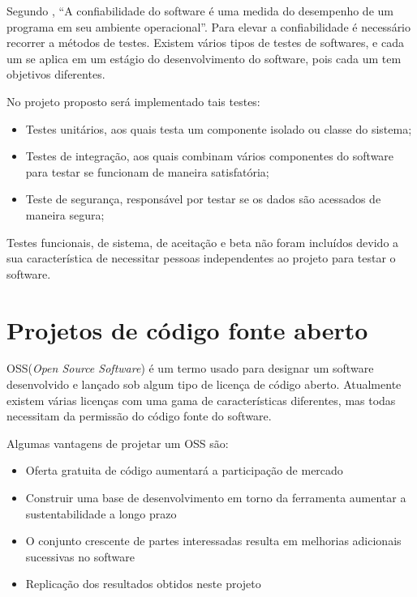 Segundo \cite{mathur1991performance}, “A confiabilidade do software é uma medida do desempenho de um programa em seu ambiente operacional”. Para elevar a confiabilidade é necessário recorrer a métodos de testes. Existem vários tipos de testes de softwares, e cada um se aplica em um estágio do desenvolvimento do software, pois cada um tem objetivos diferentes\cite{nidhra2012black}. \par
No projeto proposto será implementado tais testes: \par
\begin{itemize}  
\item Testes unitários, aos quais testa um componente isolado ou classe do sistema;
\item Testes de integração, aos quais combinam vários componentes do software para testar se funcionam de maneira satisfatória;
\item Teste de segurança, responsável por testar se os dados são acessados de maneira segura;
\end{itemize}
Testes funcionais, de sistema, de aceitação e beta não foram incluídos devido a sua característica de necessitar pessoas independentes ao projeto para testar o software.

\section{Projetos de código fonte aberto}
OSS(\textit{Open Source Software}) é um termo usado para designar um software desenvolvido e lançado sob algum tipo de licença de código aberto. Atualmente existem várias licenças com uma gama de características diferentes, mas todas necessitam da permissão do código fonte do software\cite{crowston2003defining}.

Algumas vantagens de projetar um OSS são:
\begin{itemize}  
\item Oferta gratuita de código aumentará a participação de mercado\cite{fitzgerald2006transformation}
\item Construir uma base de desenvolvimento em torno da ferramenta aumentar a sustentabilidade a longo prazo\cite{nyman2011forking}
\item O conjunto crescente de partes interessadas resulta em melhorias adicionais sucessivas no software\cite{heron2013open}
\item Replicação dos resultados obtidos neste projeto
\end{itemize}


